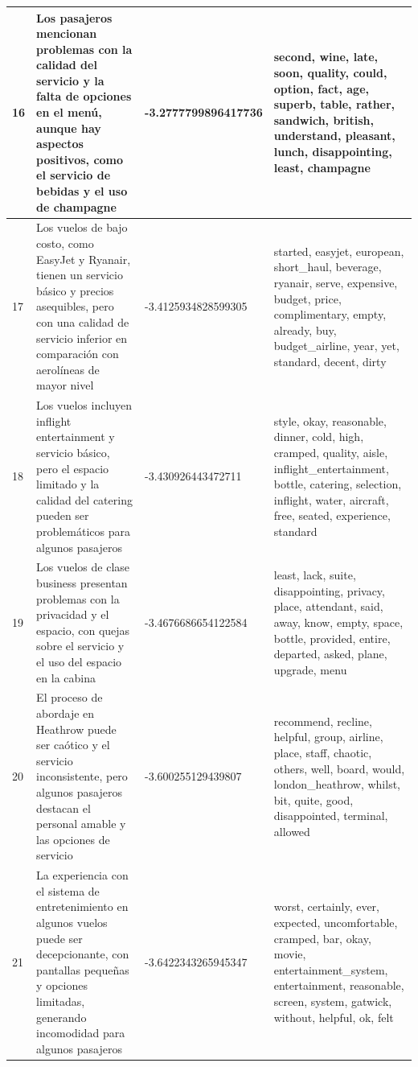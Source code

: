 \documentclass{report}
\begin{document}
{\begin{longtable}{|p{1cm}|p{4cm}|p{4cm}|p{6cm}|}
                    \hline
                    16 & Los pasajeros mencionan problemas con la calidad del servicio y la falta de opciones en el menú, aunque hay aspectos positivos, como el servicio de bebidas y el uso de champagne & -3.2777799896417736 & second, wine, late, soon, quality, could, option, fact, age, superb, table, rather, sandwich, british, understand, pleasant, lunch, disappointing, least, champagne \\
                    \hline
                    17 & Los vuelos de bajo costo, como EasyJet y Ryanair, tienen un servicio básico y precios asequibles, pero con una calidad de servicio inferior en comparación con aerolíneas de mayor nivel & -3.4125934828599305 & started, easyjet, european, short\_haul, beverage, ryanair, serve, expensive, budget, price, complimentary, empty, already, buy, budget\_airline, year, yet, standard, decent, dirty \\
                    \hline
                    18 & Los vuelos incluyen inflight entertainment y servicio básico, pero el espacio limitado y la calidad del catering pueden ser problemáticos para algunos pasajeros & -3.430926443472711 & style, okay, reasonable, dinner, cold, high, cramped, quality, aisle, inflight\_entertainment, bottle, catering, selection, inflight, water, aircraft, free, seated, experience, standard \\
                    \hline
                    19 & Los vuelos de clase business presentan problemas con la privacidad y el espacio, con quejas sobre el servicio y el uso del espacio en la cabina & -3.4676686654122584 & least, lack, suite, disappointing, privacy, place, attendant, said, away, know, empty, space, bottle, provided, entire, departed, asked, plane, upgrade, menu \\
                    \hline
                    20 & El proceso de abordaje en Heathrow puede ser caótico y el servicio inconsistente, pero algunos pasajeros destacan el personal amable y las opciones de servicio & -3.600255129439807 & recommend, recline, helpful, group, airline, place, staff, chaotic, others, well, board, would, london\_heathrow, whilst, bit, quite, good, disappointed, terminal, allowed \\
                    \hline
                    21 & La experiencia con el sistema de entretenimiento en algunos vuelos puede ser decepcionante, con pantallas pequeñas y opciones limitadas, generando incomodidad para algunos pasajeros & -3.6422343265945347 & worst, certainly, ever, expected, uncomfortable, cramped, bar, okay, movie, entertainment\_system, entertainment, reasonable, screen, system, gatwick, without, helpful, ok, felt \\

\end{longtable}}
\end{document}

